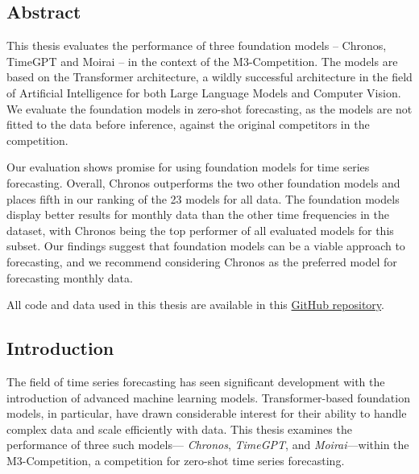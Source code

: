 \documentclass[12pt,a4paper]{article}
\begin{document}
\newpage
\begin{center}
 \section*{Abstract}
\end{center}

\begin{center}
  This thesis evaluates the performance of three foundation models – Chronos, TimeGPT and Moirai – in the context of the M3-Competition. The models are based on the Transformer architecture, a wildly successful architecture in the field of Artificial Intelligence for both Large Language Models and Computer Vision. We evaluate the foundation models in zero-shot forecasting, as the models are not fitted to the data before inference, against the original competitors in the competition. 

  Our evaluation shows promise for using foundation models for time series forecasting. Overall, Chronos outperforms the two other foundation models and places fifth in our ranking of the 23 models for all data. The foundation models display better results for monthly data than the other time frequencies in the dataset, with Chronos being the top performer of all evaluated models for this subset. Our findings suggest that foundation models can be a viable approach to forecasting, and we recommend considering Chronos as the preferred model for forecasting monthly data. 
  
  All code and data used in this thesis are available in this \href{https://github.com/tom-alten/Outsmarting-Time/}{GitHub repository}.
  
\end{center}
\newpage

\hypersetup{
  linkcolor=black
}

\tableofcontents  %

\hypersetup{
  linkcolor=blue
}
\newpage          %

\begin{center}
  \section{Introduction}
\end{center}
The field of time series forecasting has seen significant development with the introduction of advanced machine learning models. Transformer-based foundation models, in particular, have drawn considerable interest for their ability to handle complex data and scale efficiently with data. This thesis examines the performance of three such models— \textit{Chronos}, \textit{TimeGPT}, and \textit{Moirai}—within the M3-Competition, a competition for zero-shot time series forecasting.
\end{document}
